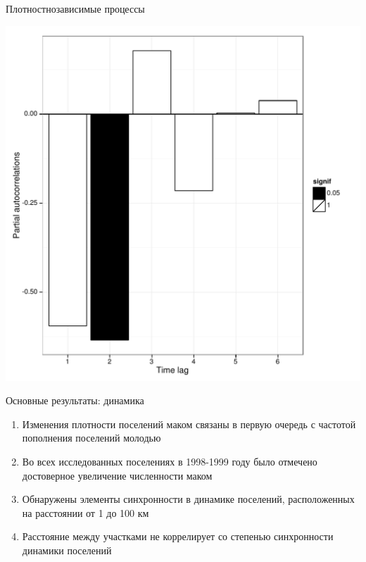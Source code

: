 \documentclass{beamer}
\begin{document}
\begin{frame}{Плотностнозависимые процессы}
 \begin{center}
		\includegraphics[width=.8\textwidth]{perm_PRCF_YuG_detrend.pdf}
 \end{center}
\end{frame}




\begin{frame}{Основные результаты: динамика}
	\begin{enumerate}
		\item Изменения плотности поселений маком связаны в первую очередь с частотой пополнения поселений молодью
		\item Во всех исследованных поселениях в 1998-1999 году было отмечено достоверное увеличение численности маком 
		\item Обнаружены элементы синхронности в динамике поселений, расположенных на расстоянии от 1 до 100 км
		\item Расстояние между участками не коррелирует со степенью синхронности динамики поселений
	\end{enumerate}
\end{frame}
\end{document}
